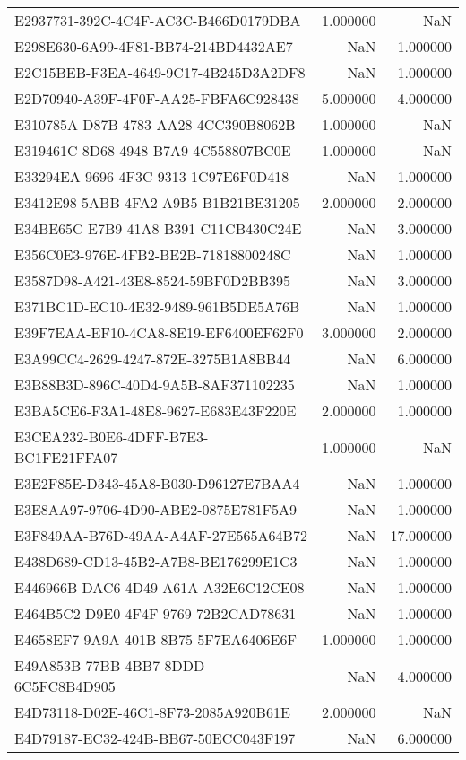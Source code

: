 \begin{tabular}{lrr}
E2937731-392C-4C4F-AC3C-B466D0179DBA & 1.000000 & NaN \\
E298E630-6A99-4F81-BB74-214BD4432AE7 & NaN & 1.000000 \\
E2C15BEB-F3EA-4649-9C17-4B245D3A2DF8 & NaN & 1.000000 \\
E2D70940-A39F-4F0F-AA25-FBFA6C928438 & 5.000000 & 4.000000 \\
E310785A-D87B-4783-AA28-4CC390B8062B & 1.000000 & NaN \\
E319461C-8D68-4948-B7A9-4C558807BC0E & 1.000000 & NaN \\
E33294EA-9696-4F3C-9313-1C97E6F0D418 & NaN & 1.000000 \\
E3412E98-5ABB-4FA2-A9B5-B1B21BE31205 & 2.000000 & 2.000000 \\
E34BE65C-E7B9-41A8-B391-C11CB430C24E & NaN & 3.000000 \\
E356C0E3-976E-4FB2-BE2B-71818800248C & NaN & 1.000000 \\
E3587D98-A421-43E8-8524-59BF0D2BB395 & NaN & 3.000000 \\
E371BC1D-EC10-4E32-9489-961B5DE5A76B & NaN & 1.000000 \\
E39F7EAA-EF10-4CA8-8E19-EF6400EF62F0 & 3.000000 & 2.000000 \\
E3A99CC4-2629-4247-872E-3275B1A8BB44 & NaN & 6.000000 \\
E3B88B3D-896C-40D4-9A5B-8AF371102235 & NaN & 1.000000 \\
E3BA5CE6-F3A1-48E8-9627-E683E43F220E & 2.000000 & 1.000000 \\
E3CEA232-B0E6-4DFF-B7E3-BC1FE21FFA07 & 1.000000 & NaN \\
E3E2F85E-D343-45A8-B030-D96127E7BAA4 & NaN & 1.000000 \\
E3E8AA97-9706-4D90-ABE2-0875E781F5A9 & NaN & 1.000000 \\
E3F849AA-B76D-49AA-A4AF-27E565A64B72 & NaN & 17.000000 \\
E438D689-CD13-45B2-A7B8-BE176299E1C3 & NaN & 1.000000 \\
E446966B-DAC6-4D49-A61A-A32E6C12CE08 & NaN & 1.000000 \\
E464B5C2-D9E0-4F4F-9769-72B2CAD78631 & NaN & 1.000000 \\
E4658EF7-9A9A-401B-8B75-5F7EA6406E6F & 1.000000 & 1.000000 \\
E49A853B-77BB-4BB7-8DDD-6C5FC8B4D905 & NaN & 4.000000 \\
E4D73118-D02E-46C1-8F73-2085A920B61E & 2.000000 & NaN \\
E4D79187-EC32-424B-BB67-50ECC043F197 & NaN & 6.000000 \\

\end{tabular}
